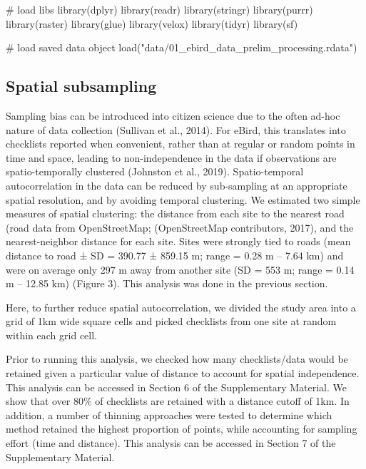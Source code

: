 \documentclass[]{article}
\newenvironment{Shaded}{}{}
\newcommand{\CommentTok}[1]{\textcolor[rgb]{0.00,0.50,0.00}{#1}}
\newcommand{\KeywordTok}[1]{\textcolor[rgb]{0.00,0.00,1.00}{#1}}
\newcommand{\NormalTok}[1]{#1}
\newcommand{\StringTok}[1]{\textcolor[rgb]{0.00,0.50,0.50}{#1}}
\begin{document}
\begin{Shaded}
\begin{Highlighting}[numbers=left,,]

\CommentTok{# load libs}
\KeywordTok{library}\NormalTok{(dplyr)}
\KeywordTok{library}\NormalTok{(readr)}
\KeywordTok{library}\NormalTok{(stringr)}
\KeywordTok{library}\NormalTok{(purrr)}
\KeywordTok{library}\NormalTok{(raster)}
\KeywordTok{library}\NormalTok{(glue)}
\KeywordTok{library}\NormalTok{(velox)}
\KeywordTok{library}\NormalTok{(tidyr)}
\KeywordTok{library}\NormalTok{(sf)}

\CommentTok{# load saved data object}
\KeywordTok{load}\NormalTok{(}\StringTok{"data/01_ebird_data_prelim_processing.rdata"}\NormalTok{)}
\end{Highlighting}
\end{Shaded}

\hypertarget{spatial-subsampling}{%
\subsection{Spatial subsampling}\label{spatial-subsampling}}

Sampling bias can be introduced into citizen science due to the often ad-hoc nature of data collection (Sullivan et al., 2014). For eBird, this translates into checklists reported when convenient, rather than at regular or random points in time and space, leading to non-independence in the data if observations are spatio-temporally clustered (Johnston et al., 2019). Spatio-temporal autocorrelation in the data can be reduced by sub-sampling at an appropriate spatial resolution, and by avoiding temporal clustering. We estimated two simple measures of spatial clustering: the distance from each site to the nearest road (road data from OpenStreetMap; (OpenStreetMap contributors, 2017), and the nearest-neighbor distance for each site. Sites were strongly tied to roads (mean distance to road ± SD = 390.77 ± 859.15 m; range = 0.28 m -- 7.64 km) and were on average only 297 m away from another site (SD = 553 m; range = 0.14 m -- 12.85 km) (Figure 3). This analysis was done in the previous section.

Here, to further reduce spatial autocorrelation, we divided the study area into a grid of 1km wide square cells and picked checklists from one site at random within each grid cell.

Prior to running this analysis, we checked how many checklists/data would be retained given a particular value of distance to account for spatial independence. This analysis can be accessed in Section 6 of the Supplementary Material. We show that over 80\% of checklists are retained with a distance cutoff of 1km. In addition, a number of thinning approaches were tested to determine which method retained the highest proportion of points, while accounting for sampling effort (time and distance). This analysis can be accessed in Section 7 of the Supplementary Material.
\end{document}
